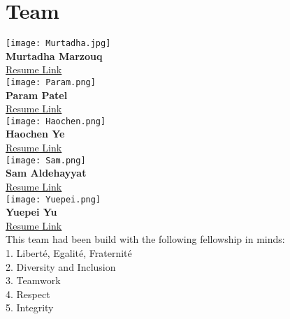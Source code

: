 \graphicspath{ {images} }

\section{Team}
    \texttt{[image: Murtadha.jpg]}\\ \textbf{Murtadha Marzouq}\\ \href{https://webpages.charlotte.edu/mmarzouq/English/Resume.pdf}{\underline{Resume Link}}\\
   \texttt{[image: Param.png]}\\ \textbf{Param Patel}\\  \href{https://drive.google.com/file/d/13jr45PMGy9iJG0CavpYmuiN5SDwGgygj/view?usp=sharing}{\underline{Resume Link}}\\
\texttt{[image: Haochen.png]}\\     \textbf{Haochen Ye}\\ \href{https://drive.google.com/file/d/1YOZvJANmngCAai1OxXm28a_7XmKGmpH1/view?usp=sharing}{\underline{Resume Link}}\\
\texttt{[image: Sam.png]}\\     \textbf{Sam Aldehayyat}\\ \href{https://drive.google.com/file/d/14jBT5AZ_GzdElLh-0LSXzP7AxgjMu0wa/view?usp=sharing}{\underline{Resume Link}}\\
\texttt{[image: Yuepei.png]}\\     \textbf{Yuepei Yu}\\ \href{https://drive.google.com/file/d/1xcBhl6kxY1gQZsCjADVlJvvDVYBJLoSo/view?usp=sharing}{\underline{Resume Link}}\\
This team had been build with the following fellowship in minds:\\
1. Liberté, Egalité, Fraternité\\
2. Diversity and Inclusion\\
3. Teamwork\\
4. Respect\\
5. Integrity\\

